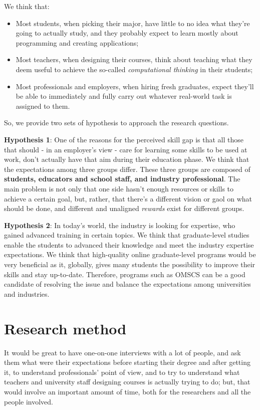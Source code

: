 \documentclass{sigchi}
\begin{document}
We think that:
\begin{itemize}
\item Most students, when picking their major, have little to no idea what they're going to actually study, and they probably expect to learn mostly about programming and creating applications;
\item Most teachers, when designing their courses, think about teaching what they deem useful to achieve the so-called \textit{computational thinking} in their students;
\item Most professionals and employers, when hiring fresh graduates, expect they'll be able to immediately and fully carry out whatever real-world task is assigned to them.
\end{itemize}

So, we provide two sets of hypothesis to approach the research questions.

\textbf{Hypothesis 1}: One of the reasons for the perceived skill gap is that all those that should - in an employer's view - care for learning some skills to be used at work, don't actually have that aim during their education phase. We think that the expectations among three groups differ. These three groups are composed of \textbf{students, educators and school staff, and industry professional}. The main problem is not only that one side hasn’t enough resources or skills to achieve a certain goal, but, rather, that there’s a different vision or gaol on what should be done, and different and unaligned \textit{rewards} exist for different groups.

\textbf{Hypothesis 2}:  In today's world, the industry is looking for expertise, who gained advanced training in certain topics. We think that graduate-level studies enable the students to advanced their knowledge and meet the industry expertise expectations. We think that high-quality online graduate-level programs would be very beneficial as it, globally, gives many students the possibility to improve their skills and stay up-to-date. Therefore, programs such as OMSCS can be a good candidate of resolving the issue and balance the expectations among universities and industries.

\section{Research method}
It would be great to have one-on-one interviews with a lot of people, and ask them what were their expectations before starting their degree and after getting it, to understand professionals' point of view, and to try to understand what teachers and university staff designing courses is actually trying to do; but, that would involve an important amount of time, both for the researchers and all the people involved.
\end{document}
